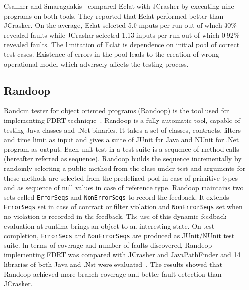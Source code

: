 Csallner and Smaragdakis~\cite{pacheco2007randoop} compared Eclat with JCrasher by executing nine programs on  both tools. They reported that Eclat performed better than JCrasher. On the average, Eclat selected 5.0 inputs per run out of which 30\% revealed faults while JCrasher selected 1.13 inputs per run out of which 0.92\% revealed faults. The limitation of Eclat is dependence on initial pool of correct test cases. Existence of errors in the pool leads to the creation of wrong operational model which adversely affects the testing process.   



\subsection{Randoop}
Random tester for object oriented programs (Randoop) is the tool used for implementing FDRT technique~\cite{pacheco2007randoop}. Randoop is a fully automatic tool, capable of testing Java classes and .Net binaries. It takes a set of classes, contracts, filters and time limit as input and gives a suite of JUnit for Java and NUnit for .Net program as output. Each unit test in a test suite is a sequence of method calls (hereafter referred as sequence). Randoop builds the sequence incrementally by randomly selecting a public method from the class under test and arguments for these methods are selected from the predefined pool in case of primitive types and as sequence of null values in case of reference type. Randoop maintains two sets called \verb+ErrorSeqs+ and \verb+NonErrorSeqs+ to record the feedback. It extends \verb+ErrorSeqs+ set in case of contract or filter violation and \verb+NonErrorSeqs+ set when no violation is recorded in the feedback. The use of this dynamic feedback evaluation at runtime brings an object to an interesting state. On test completion, \verb+ErrorSeqs+ and \verb+NonErrorSeqs+ are produced as JUnit/NUnit test suite. In terms of coverage and number of faults discovered, Randoop implementing FDRT was compared with JCrasher and JavaPathFinder and 14 libraries of both Java and .Net were evaluated~\cite{visser2004test}. The results showed that Randoop achieved more branch coverage and better fault detection than JCrasher. 

